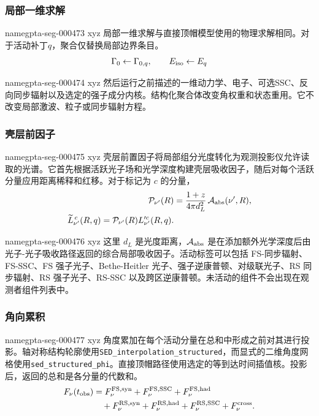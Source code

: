 \documentclass[twocolumn]{aastex702}
\makeatletter
\providecommand{\gptareaderanchor}[1]{\pdfdest name{#1} xyz}%
\providecommand{\gptareaderanchor}[1]{\special{pdf:dest (#1) [ @thispage /XYZ @xpos @ypos null ]}}%
\makeatother
\begin{document}
\subsubsection{局部一维求解}


\gptareaderanchor{gpta-seg-000473}%
局部一维求解与直接顶帽模型使用的物理求解相同。对于活动补丁\(q\)，聚合仅替换局部边界条目。
\begin{equation}
\Gamma_0\leftarrow\Gamma_{0,q},\qquad
E_{\rm iso}\leftarrow E_q
\end{equation}

\gptareaderanchor{gpta-seg-000474}%
然后运行之前描述的一维动力学、电子、可选SSC、反向同步辐射以及选定的强子成分内核。结构化聚合体改变角权重和状态重用。它不改变局部激波、粒子或同步辐射方程。

\subsubsection{壳层前因子}


\gptareaderanchor{gpta-seg-000475}%
壳层前置因子将局部组分光度转化为观测投影仪允许读取的光谱。它首先根据活跃光子场和光学深度构建壳层吸收因子，随后对每个活跃分量应用距离稀释和红移。对于标记为 \(c\) 的分量，
\begin{equation}
\begin{aligned}
\mathcal{P}_{\nu'}(R)&=
\frac{1+z}{4\pi d_L^2}\,
\mathcal{A}_{\rm abs}(\nu',R),\\
\widetilde L_{\nu'}^{\,c}(R,q)=
\mathcal{P}_{\nu'}(R)L_{\nu'}^{\prime c}(R,q).
\end{aligned}
\end{equation}

\gptareaderanchor{gpta-seg-000476}%
这里 \(d_L\) 是光度距离，\(\mathcal{A}_{\rm abs}\) 是在添加额外光学深度后由光子-光子吸收路径返回的综合局部吸收因子。活动标签可以包括 FS-同步辐射、FS-SSC、FS 强子光子、Bethe-Heitler 光子、强子逆康普顿、对级联光子、RS 同步辐射、RS 强子光子、RS-SSC 以及跨区逆康普顿。未活动的组件不会出现在观测者组件列表中。

\subsubsection{角向累积}


\gptareaderanchor{gpta-seg-000477}%
角度累加在每个活动分量在总和中形成之前对其进行投影。轴对称结构轮廓使用\texttt{SED\_interpolation\_structured}，而显式的二维角度网格使用\texttt{sed\_structured\_phi}。直接顶帽路径使用选定的等到达时间插值核。投影后，返回的总和是各分量的代数和。
\begin{equation}
\begin{aligned}
F_{\nu}(t_{\rm obs})&=
F_{\nu}^{\rm FS,syn}
+F_{\nu}^{\rm FS,SSC}
+F_{\nu}^{\rm FS,had}\\
&\quad
+F_{\nu}^{\rm RS,syn}
+F_{\nu}^{\rm RS,had}
+F_{\nu}^{\rm RS,SSC}
+F_{\nu}^{\rm cross}.
\end{aligned}
\end{equation}
\end{document}
